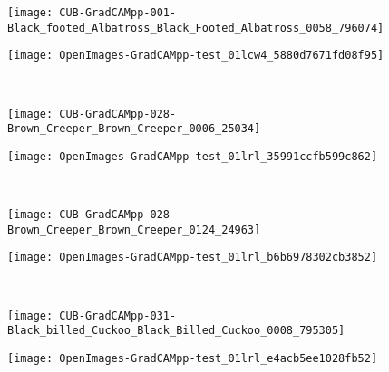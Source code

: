 \documentclass[twocolumn]{article}
\theoremstyle{definition}
\begin{document}
\begin{figure*}
     \centering
     \begin{subfigure}[b]{0.49\textwidth}
         \centering
         \texttt{[image: CUB-GradCAMpp-001-Black\_footed\_Albatross\_Black\_Footed\_Albatross\_0058\_796074]}
     \end{subfigure}
     \hfill
     \begin{subfigure}[b]{0.49\textwidth}
         \centering
         \texttt{[image: OpenImages-GradCAMpp-test\_01lcw4\_5880d7671fd08f95]}
     \end{subfigure}
     \\
     \vspace{0.1cm}
     \begin{subfigure}[b]{0.49\textwidth}
         \centering
         \texttt{[image: CUB-GradCAMpp-028-Brown\_Creeper\_Brown\_Creeper\_0006\_25034]}
     \end{subfigure}
     \hfill
     \begin{subfigure}[b]{0.49\textwidth}
         \centering
         \texttt{[image: OpenImages-GradCAMpp-test\_01lrl\_35991ccfb599c862]}
     \end{subfigure}
     \\
     \vspace{0.1cm}
     \begin{subfigure}[b]{0.49\textwidth}
         \centering
         \texttt{[image: CUB-GradCAMpp-028-Brown\_Creeper\_Brown\_Creeper\_0124\_24963]}
     \end{subfigure}
     \hfill
     \begin{subfigure}[b]{0.49\textwidth}
         \centering
         \texttt{[image: OpenImages-GradCAMpp-test\_01lrl\_b6b6978302cb3852]}
     \end{subfigure}
     \\
     \vspace{0.1cm}
     \begin{subfigure}[b]{0.49\textwidth}
         \centering
         \texttt{[image: CUB-GradCAMpp-031-Black\_billed\_Cuckoo\_Black\_Billed\_Cuckoo\_0008\_795305]}
     \end{subfigure}
     \hfill
     \begin{subfigure}[b]{0.49\textwidth}
         \centering
         \texttt{[image: OpenImages-GradCAMpp-test\_01lrl\_e4acb5ee1028fb52]}
     \end{subfigure}
     \\
     \vspace{0.1cm}

\end{figure*}
\end{document}

